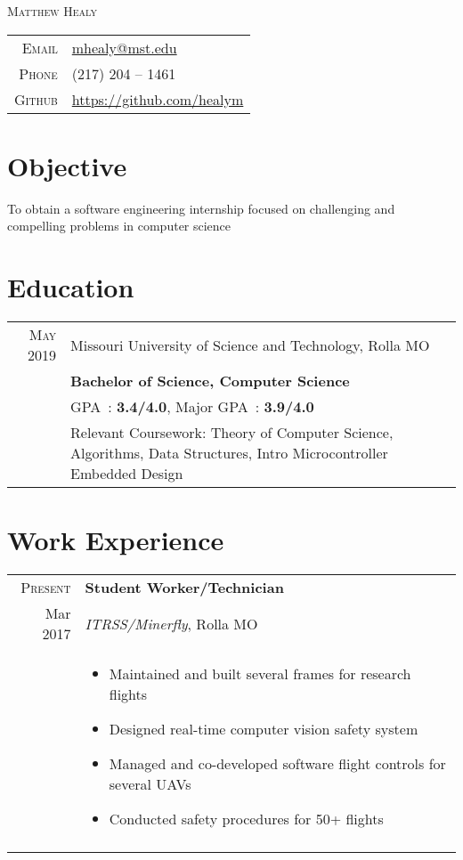 \documentclass[a4paper,10pt]{article}
\newcommand{\br}{\\\multicolumn{2}{c}{}}
\begin{document}
\pagestyle{empty}

\par{\centering
    {\Huge \textsc{Matthew Healy}
}\bigskip\par}

\begin{center}
\begin{tabular}{rl}
    \textsc{Email } & \href{mailto:mhealy@mst.edu}{mhealy@mst.edu} \\
    \textsc{Phone }        & (217) 204 -- 1461  \\
    \textsc{Github }      & \url{https://github.com/healym}
\end{tabular}
\end{center}

\section{Objective}
To obtain a software engineering internship focused on challenging and compelling problems in computer science


\section{Education}
\begin{tabular}{r|p{15cm}}
    \textsc{May} 2019 & Missouri University of Science and Technology, Rolla MO  \\
                      & \textbf{Bachelor of Science, Computer Science} \\
                      & GPA~: \textbf{3.4/4.0}, Major GPA~: \textbf{3.9/4.0} \\
                      & Relevant Coursework:
                      Theory of Computer Science,
                      Algorithms,
                      Data Structures,
                      Intro Microcontroller Embedded Design
\end{tabular}


\section{Work Experience}
\begin{tabular}{r|p{15cm}}
    \textsc{Present} & \textbf{Student Worker/Technician} \\
    Mar 2017         & \textit{ITRSS/Minerfly}, Rolla MO \\ &
    \begin{itemize}
    \item{Maintained and built several frames for research flights}
    \item{Designed real-time computer vision safety system}
    \item{Managed and co-developed software flight controls for several UAVs}
    \item{Conducted safety procedures for 50+ flights}

    \end{itemize} \br\\

\end{tabular}
\end{document}
